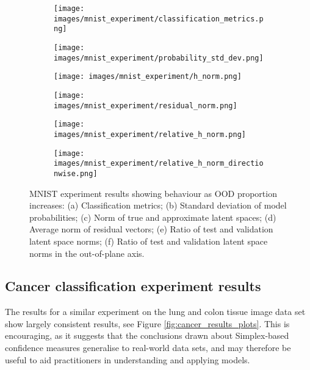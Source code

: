 \documentclass{article}
\begin{document}
\begin{figure}[ht]

\begin{subfigure}{.33\linewidth}
  \texttt{[image: images/mnist\_experiment/classification\_metrics.png]}
  \caption{}
  \label{res:mnist accuracy}
\end{subfigure}\hfill %
\begin{subfigure}{.33\linewidth}
  \texttt{[image: images/mnist\_experiment/probability\_std\_dev.png]}
  \caption{}
  \label{res:mnist prob std}
\end{subfigure}\hfill %
\begin{subfigure}{.33\linewidth}
  \texttt{[image: images/mnist\_experiment/h\_norm.png]}
  \caption{}
  \label{res:mnist h norm}
\end{subfigure}


\begin{subfigure}{.33\linewidth}
  \texttt{[image: images/mnist\_experiment/residual\_norm.png]}
  \caption{}
  \label{res:mnist r norm}
\end{subfigure}\hfill %
\begin{subfigure}{.33\linewidth}
  \texttt{[image: images/mnist\_experiment/relative\_h\_norm.png]}
  \caption{}
  \label{res:mnist relative h norm}
\end{subfigure}\hfill %
\begin{subfigure}{.33\linewidth}
  \texttt{[image: images/mnist\_experiment/relative\_h\_norm\_directionwise.png]}
  \caption{}
  \label{res:mnist relative h norm directionwise}
\end{subfigure}

\caption{
MNIST experiment results showing behaviour as OOD proportion increases:
(a) Classification metrics; (b) Standard deviation of model probabilities; (c) Norm of true and approximate latent spaces;
(d) Average norm of residual vectors; (e) Ratio of test and validation latent space norms; (f) Ratio of test and validation latent space norms in the out-of-plane axis.
}
\label{fig:mnist_results_ plots}
\end{figure}



\subsection{Cancer classification experiment results}
\label{sec:cancer results}
The results for a similar experiment on the lung and colon tissue image data set show largely consistent results, see Figure \ref{fig:cancer_results_plots}. This is encouraging, as it suggests that the conclusions drawn about Simplex-based confidence measures generalise to real-world data sets, and may therefore be useful to aid practitioners in understanding and applying models.
\end{document}
